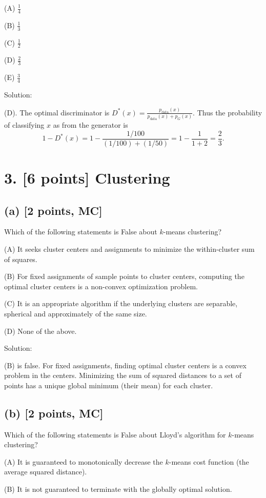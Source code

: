 \documentclass[twocolumn]{article}
\begin{document}
\begin{spacing}{1}
(A) \(\tfrac{1}{4}\)

(B) \(\tfrac{1}{3}\)

(C) \(\tfrac{1}{2}\)

(D) \(\tfrac{2}{3}\)

(E) \(\tfrac{3}{4}\)

Solution:

(D). The optimal discriminator is \(D^*(x) = \frac{p_{\text{data}}(x)}{p_{\text{data}}(x) + p_G(x)}\). Thus the probability of classifying \(x\) as from the generator is
\[
1 - D^*(x) 
= 1 - \frac{1/100}{(1/100) + (1/50)} 
= 1 - \frac{1}{1 + 2} 
= \frac{2}{3}.
\]

\bigskip

\section{3. [6 points] Clustering}

\subsection*{(a) [2 points, MC]}
Which of the following statements is False about \(k\)-means clustering?

(A) It seeks cluster centers and assignments to minimize the within-cluster sum of squares.

(B) For fixed assignments of sample points to cluster centers, computing the optimal cluster centers is a non-convex optimization problem.

(C) It is an appropriate algorithm if the underlying clusters are separable, spherical and approximately of the same size.

(D) None of the above.

Solution:

(B) is false. For fixed assignments, finding optimal cluster centers is a convex problem in the centers. Minimizing the sum of squared distances to a set of points has a unique global minimum (their mean) for each cluster.

\subsection*{(b) [2 points, MC]}
Which of the following statements is False about Lloyd's algorithm for \(k\)-means clustering?

(A) It is guaranteed to monotonically decrease the \(k\)-means cost function (the average squared distance).

(B) It is not guaranteed to terminate with the globally optimal solution.


\end{spacing}
\end{document}
